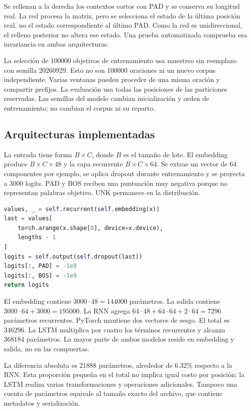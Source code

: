 Se rellenan a la derecha los contextos cortos con PAD y se conserva
su longitud real. La red procesa la matriz, pero se selecciona el estado
de la última posición real, no el estado correspondiente al último PAD.
Como la red es unidireccional, el relleno posterior no altera ese estado.
Una prueba automatizada comprueba esa invariancia en ambas arquitecturas.

La selección de 100000 objetivos de entrenamiento usa muestreo sin
reemplazo con semilla 20260929. Esto no son 100000 oraciones ni un nuevo
corpus independiente. Varias ventanas pueden proceder de una misma
oración y compartir prefijos. La evaluación usa todas las posiciones de
las particiones reservadas. Las semillas del modelo cambian inicialización
y orden de entrenamiento; no cambian el corpus ni su reparto.

\subsection{Arquitecturas implementadas}
La entrada tiene forma $B\times C$, donde $B$ es el tamaño de lote.
El embedding produce $B\times C\times48$ y la capa recurrente
$B\times C\times64$. Se extrae un vector de 64 componentes por
ejemplo, se aplica dropout durante entrenamiento y se proyecta a
3000 logits. PAD y BOS reciben una puntuación muy negativa porque
no representan palabras objetivo. UNK permanece en la distribución.

\begin{lstlisting}[language=Python]
values, _ = self.recurrent(self.embedding(x))
last = values[
    torch.arange(x.shape[0], device=x.device),
    lengths - 1
]
logits = self.output(self.dropout(last))
logits[:, PAD] = -1e9
logits[:, BOS] = -1e9
return logits
\end{lstlisting}

El embedding contiene $3000\cdot48=144000$ parámetros.
La salida contiene $3000\cdot64+3000=195000$.
La RNN agrega $64\cdot48+64\cdot64+2\cdot64=7296$
parámetros recurrentes. PyTorch mantiene dos vectores de sesgo.
El total es 346296. La LSTM multiplica por cuatro los términos
recurrentes y alcanza 368184 parámetros. La mayor parte de ambos
modelos reside en embedding y salida, no en las compuertas.

La diferencia absoluta es 21888 parámetros, alrededor de 6.32\%
respecto a la RNN. Esta proporción pequeña en el total no implica
igual costo por posición: la LSTM realiza varias transformaciones y
operaciones adicionales. Tampoco una cuenta de parámetros equivale
al tamaño exacto del archivo, que contiene metadatos y serialización.


